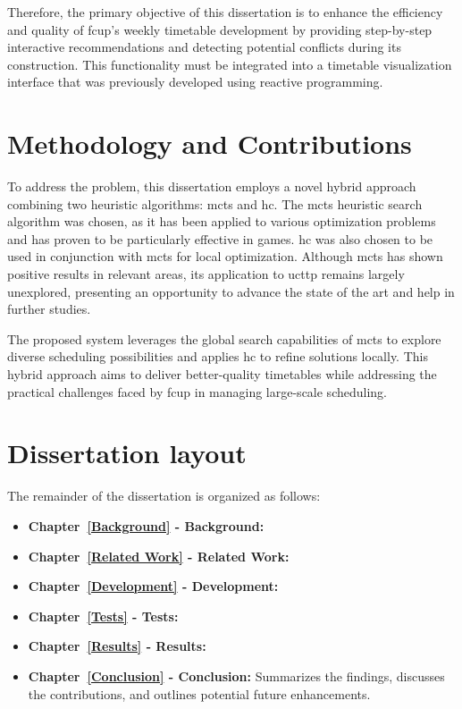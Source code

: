 Therefore, the primary objective of this dissertation is to enhance the efficiency and quality of \ac{fcup}'s weekly timetable development by providing step-by-step interactive recommendations and detecting potential conflicts during its construction. This functionality must be integrated into a timetable visualization interface that was previously developed using reactive programming.

\section{Methodology and Contributions}

To address the problem, this dissertation employs a novel hybrid approach combining two heuristic algorithms: \ac{mcts} and \ac{hc}. The \ac{mcts} heuristic search algorithm was chosen, as it has been applied to various optimization problems and has proven to be particularly effective in games. \ac{hc} was also chosen to be used in conjunction with \ac{mcts} for local optimization. Although \ac{mcts} has shown positive results in relevant areas, its application to \ac{ucttp} remains largely unexplored, presenting an opportunity to advance the state of the art and help in further studies. 

The proposed system leverages the global search capabilities of \ac{mcts} to explore diverse scheduling possibilities and applies \ac{hc} to refine solutions locally. This hybrid approach aims to deliver better-quality timetables while addressing the practical challenges faced by \ac{fcup} in managing large-scale scheduling.

\section{Dissertation layout}

The remainder of the dissertation is organized as follows:

\begin{itemize}
\item \textbf{Chapter~\ref{Background} - Background:}
\item \textbf{Chapter~\ref{Related Work} -  Related Work:}
\item \textbf{Chapter~\ref{Development} -  Development:}
\item \textbf{Chapter~\ref{Tests} - Tests:}
\item \textbf{Chapter~\ref{Results} -  Results:}
\item \textbf{Chapter~\ref{Conclusion} - Conclusion:} Summarizes the findings, discusses the contributions, and outlines potential future enhancements.
\end{itemize}




